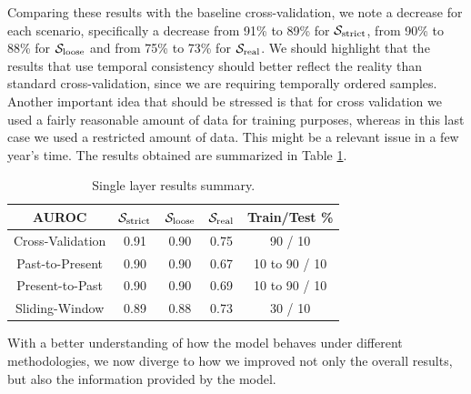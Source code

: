 Comparing these results with the baseline cross-validation, we note a decrease for each scenario, specifically a decrease from 91\% to 89\% for $\mathcal{S}_{\mathrm{strict}}$, from 90\% to 88\% for $\mathcal{S}_{\mathrm{loose}}$ and from 75\% to 73\% for $\mathcal{S}_{\mathrm{real}}$.
We should highlight that the results that use temporal consistency should better reflect the reality than standard cross-validation, since we are requiring temporally ordered samples.
Another important idea that should be stressed is that for cross validation we used a fairly reasonable amount of data for training purposes, whereas in this last case we used a restricted amount of data. This might be a relevant issue in a few year's time. The results obtained are summarized in Table \ref{tab:singlelayer_results}.

\begin{table}[!htb]
	\renewcommand{\arraystretch}{1.2} %
	\centering
	\begin{tabular}{ccccc}
	\hline AUROC & $\mathcal{S}_{\mathrm{strict}}$ & $\mathcal{S}_{\mathrm{loose}}$ & $\mathcal{S}_{\mathrm{real}}$ & Train/Test \%\\
	\hline Cross-Validation & 0.91 & 0.90 & 0.75 & 90 / 10\\
	\hline Past-to-Present & 0.90 & 0.90 & 0.67 & 10 to 90 / 10\\
	\hline Present-to-Past & 0.90 & 0.90 & 0.69 & 10 to 90 / 10\\
	\hline Sliding-Window & 0.89 & 0.88 & 0.73 & 30 / 10\\
	\hline
\end{tabular}
\caption{Single layer results summary.}
\label{tab:singlelayer_results}
\end{table}

\medskip

With a better understanding of how the model behaves under different methodologies, we now diverge to how we improved not only the overall results, but also the information provided by the model.

